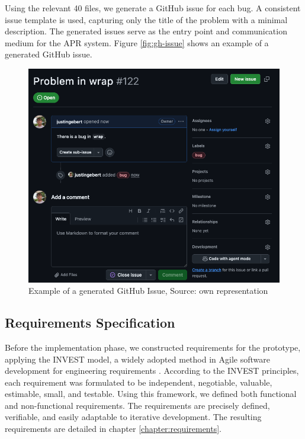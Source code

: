 Using the relevant 40 files, we generate a GitHub issue for each bug. A consistent issue template is used, capturing only the title of the problem with a minimal description. The generated issues serve as the entry point and communication medium for the APR system. Figure \ref{fig:gh-issue} shows an example of a generated GitHub issue.

\begin{figure}[H]
    \centering
    \includegraphics[width=1\textwidth]{images/github/github_issue.png}
    \caption{Example of a generated GitHub Issue, Source: own representation}
    \label{fig:gh-issue2}
\end{figure}

\subsection{Requirements Specification}

Before the implementation phase, we constructed requirements for the prototype, applying the INVEST model, a widely adopted method in Agile software development for engineering requirements \cite{10.5555/984017}. According to the INVEST principles, each requirement was formulated to be independent, negotiable, valuable, estimable, small, and testable. Using this framework, we defined both functional and non-functional requirements. The requirements are precisely defined, verifiable, and easily adaptable to iterative development. The resulting requirements are detailed in chapter \ref{chapter:requirements}.


